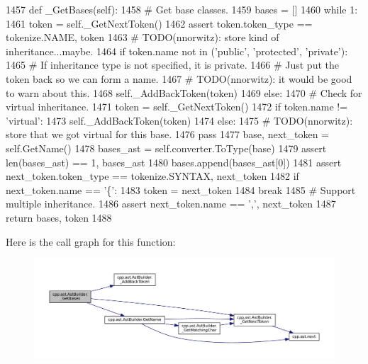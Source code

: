 \begin{DoxyCode}
1457     \textcolor{keyword}{def }\_GetBases(self):
1458         \textcolor{comment}{# Get base classes.}
1459         bases = []
1460         \textcolor{keywordflow}{while} 1:
1461             token = self.\_GetNextToken()
1462             \textcolor{keyword}{assert} token.token\_type == tokenize.NAME, token
1463             \textcolor{comment}{# TODO(nnorwitz): store kind of inheritance...maybe.}
1464             \textcolor{keywordflow}{if} token.name \textcolor{keywordflow}{not} \textcolor{keywordflow}{in} (\textcolor{stringliteral}{'public'}, \textcolor{stringliteral}{'protected'}, \textcolor{stringliteral}{'private'}):
1465                 \textcolor{comment}{# If inheritance type is not specified, it is private.}
1466                 \textcolor{comment}{# Just put the token back so we can form a name.}
1467                 \textcolor{comment}{# TODO(nnorwitz): it would be good to warn about this.}
1468                 self.\_AddBackToken(token)
1469             \textcolor{keywordflow}{else}:
1470                 \textcolor{comment}{# Check for virtual inheritance.}
1471                 token = self.\_GetNextToken()
1472                 \textcolor{keywordflow}{if} token.name != \textcolor{stringliteral}{'virtual'}:
1473                     self.\_AddBackToken(token)
1474                 \textcolor{keywordflow}{else}:
1475                     \textcolor{comment}{# TODO(nnorwitz): store that we got virtual for this base.}
1476                     \textcolor{keywordflow}{pass}
1477             base, next\_token = self.GetName()
1478             bases\_ast = self.converter.ToType(base)
1479             \textcolor{keyword}{assert} len(bases\_ast) == 1, bases\_ast
1480             bases.append(bases\_ast[0])
1481             \textcolor{keyword}{assert} next\_token.token\_type == tokenize.SYNTAX, next\_token
1482             \textcolor{keywordflow}{if} next\_token.name == \textcolor{stringliteral}{'\{'}:
1483                 token = next\_token
1484                 \textcolor{keywordflow}{break}
1485             \textcolor{comment}{# Support multiple inheritance.}
1486             \textcolor{keyword}{assert} next\_token.name == \textcolor{stringliteral}{','}, next\_token
1487         \textcolor{keywordflow}{return} bases, token
1488 
\end{DoxyCode}
Here is the call graph for this function\+:
\nopagebreak
\begin{figure}[H]
\begin{center}
\leavevmode
\includegraphics[width=350pt]{classcpp_1_1ast_1_1AstBuilder_a5682851612e95587469f0c6d29d87e01_cgraph}
\end{center}
\end{figure}
